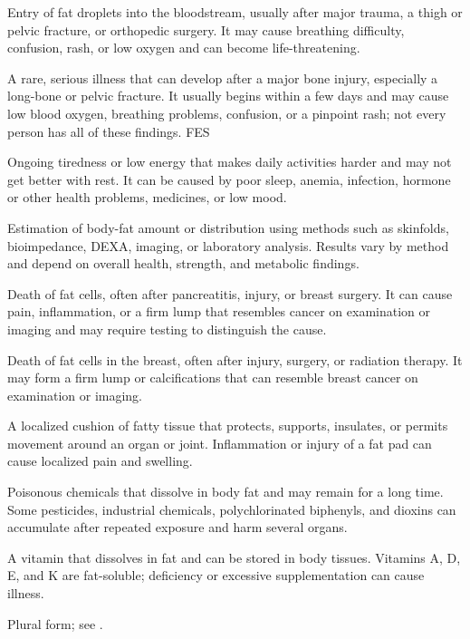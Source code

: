  Entry of fat droplets into the bloodstream, usually after major trauma, a thigh or pelvic fracture, or orthopedic surgery. It may cause breathing difficulty, confusion, rash, or low oxygen and can become life-threatening.

 A rare, serious illness that can develop after a major bone injury, especially a long-bone or pelvic fracture. It usually begins within a few days and may cause low blood oxygen, breathing problems, confusion, or a pinpoint rash; not every person has all of these findings.
\synonyms
FES

 Ongoing tiredness or low energy that makes daily activities harder and may not get better with rest. It can be caused by poor sleep, anemia, infection, hormone or other health problems, medicines, or low mood.

 Estimation of body-fat amount or distribution using methods such as skinfolds, bioimpedance, DEXA, imaging, or laboratory analysis. Results vary by method and depend on overall health, strength, and metabolic findings.

 Death of fat cells, often after pancreatitis, injury, or breast surgery. It can cause pain, inflammation, or a firm lump that resembles cancer on examination or imaging and may require testing to distinguish the cause.

 Death of fat cells in the breast, often after injury, surgery, or radiation therapy. It may form a firm lump or calcifications that can resemble breast cancer on examination or imaging.

 A localized cushion of fatty tissue that protects, supports, insulates, or permits movement around an organ or joint. Inflammation or injury of a fat pad can cause localized pain and swelling.

 Poisonous chemicals that dissolve in body fat and may remain for a long time. Some pesticides, industrial chemicals, polychlorinated biphenyls, and dioxins can accumulate after repeated exposure and harm several organs.

 A vitamin that dissolves in fat and can be stored in body tissues. Vitamins A, D, E, and K are fat-soluble; deficiency or excessive supplementation can cause illness.

 Plural form; see .

